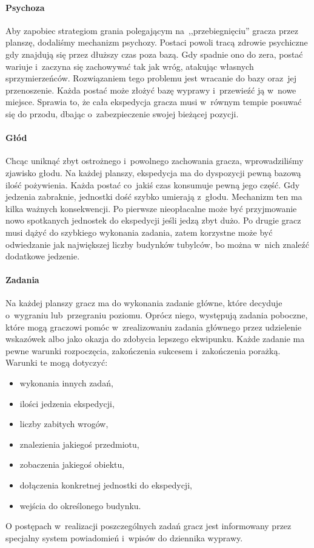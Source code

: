 \documentclass[licencjacka]{pracamgr}
\begin{document}
      \paragraph{Psychoza}
        Aby zapobiec strategiom grania polegającym na~,,przebiegnięciu'' gracza przez planszę, dodaliśmy mechanizm
        psychozy. Postaci	powoli tracą zdrowie psychiczne gdy znajdują się przez dłuższy czas poza bazą. Gdy spadnie ono
        do zera, postać wariuje i~zaczyna się zachowywać tak jak wróg, atakując własnych sprzymierzeńców. Rozwiązaniem tego
        problemu jest wracanie do bazy oraz~jej przenoszenie. Każda postać może złożyć bazę wyprawy i~przewieźć ją w~nowe
        miejsce. Sprawia to, że cała ekspedycja gracza musi w~równym tempie posuwać się do przodu, dbając o~zabezpieczenie
        swojej bieżącej pozycji.
      \paragraph{Głód}
        Chcąc uniknąć zbyt ostrożnego i~powolnego zachowania gracza, wprowadziliśmy zjawisko głodu. Na każdej planszy,
        ekspedycja ma do dyspozycji pewną bazową ilość pożywienia. Każda postać co~jakiś czas konsumuje pewną jego część.
        Gdy jedzenia zabraknie, jednostki dość szybko umierają z~głodu. Mechanizm ten ma kilka ważnych konsekwencji. Po
        pierwsze nieopłacalne może być przyjmowanie nowo spotkanych jednostek do ekspedycji	jeśli jedzą zbyt dużo. Po
        drugie gracz musi dążyć do szybkiego wykonania zadania, zatem korzystne może być odwiedzanie jak największej liczby
        budynków tubylców, bo można w~nich znaleźć dodatkowe jedzenie.
      \paragraph{Zadania}
        Na każdej planszy gracz ma do wykonania zadanie główne, które decyduje o~wygraniu lub~przegraniu poziomu. Oprócz
        niego, występują zadania poboczne, które mogą graczowi pomóc w~zrealizowaniu zadania głównego przez udzielenie
        wskazówek albo jako okazja do zdobycia lepszego ekwipunku. Każde zadanie ma pewne warunki rozpoczęcia, zakończenia
        sukcesem i~zakończenia porażką. Warunki te mogą dotyczyć:
        \begin{itemize}
          \item wykonania innych zadań,
          \item ilości jedzenia ekspedycji,
          \item liczby zabitych wrogów,
          \item znalezienia jakiegoś przedmiotu,
          \item zobaczenia jakiegoś obiektu,
          \item dołączenia konkretnej jednostki do ekspedycji,
          \item wejścia do określonego budynku.
         \end{itemize}
        O postępach w~realizacji poszczególnych zadań gracz jest informowany przez specjalny system powiadomień i~wpisów
        do dziennika wyprawy.
\end{document}
